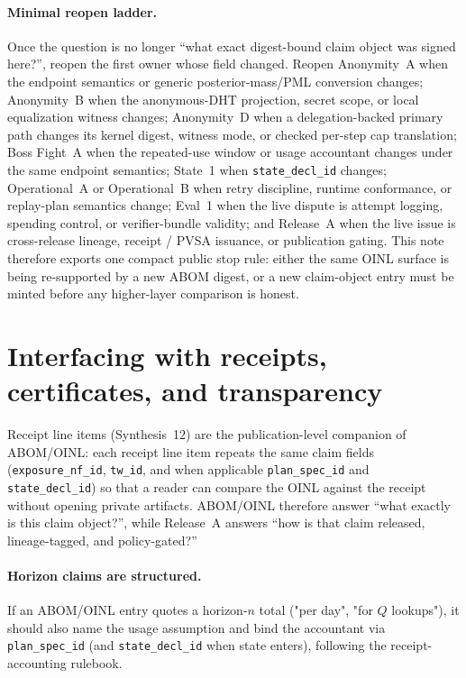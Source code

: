 \documentclass[11pt]{article}
\begin{document}
\paragraph{Minimal reopen ladder.}
Once the question is no longer ``what exact digest-bound claim object was signed here?'', reopen the first owner whose field changed. Reopen Anonymity~A when the endpoint semantics or generic posterior-mass/PML conversion changes; Anonymity~B when the anonymous-DHT projection, secret scope, or local equalization witness changes; Anonymity~D when a delegation-backed primary path changes its kernel digest, witness mode, or checked per-step cap translation; Boss Fight~A when the repeated-use window or usage accountant changes under the same endpoint semantics; State~1 when \texttt{state\_decl\_id} changes; Operational~A or Operational~B when retry discipline, runtime conformance, or replay-plan semantics change; Eval~1 when the live dispute is attempt logging, spending control, or verifier-bundle validity; and Release~A when the live issue is cross-release lineage, receipt / PVSA issuance, or publication gating. This note therefore exports one compact public stop rule: either the same OINL surface is being re-supported by a new ABOM digest, or a new claim-object entry must be minted before any higher-layer comparison is honest.\cite{series:bossfightA,series:profiling,series:spectral2budget,series:state1,series:opretries,series:runtimeprivacy,series:evalnotary,series:releaseproperty}

\section{Interfacing with receipts, certificates, and transparency}

Receipt line items (Synthesis~12) are the publication-level companion of ABOM/OINL: each receipt line item repeats the same claim fields (\texttt{exposure\_nf\_id}, \texttt{tw\_id}, and when applicable \texttt{plan\_spec\_id} and \texttt{state\_decl\_id}) so that a reader can compare the OINL against the receipt without opening private artifacts.\cite{series:receiptitems}
ABOM/OINL therefore answer ``what exactly is this claim object?'', while Release~A answers ``how is that claim released, lineage-tagged, and policy-gated?''\cite{series:releaseproperty}

\paragraph{Horizon claims are structured.}
If an ABOM/OINL entry quotes a horizon-$n$ total ("per day", "for $Q$ lookups"), it should also name the usage assumption and bind the accountant via \texttt{plan\_spec\_id} (and \texttt{state\_decl\_id} when state enters), following the receipt-accounting rulebook.\cite{series:accountingrulebook}
\end{document}
